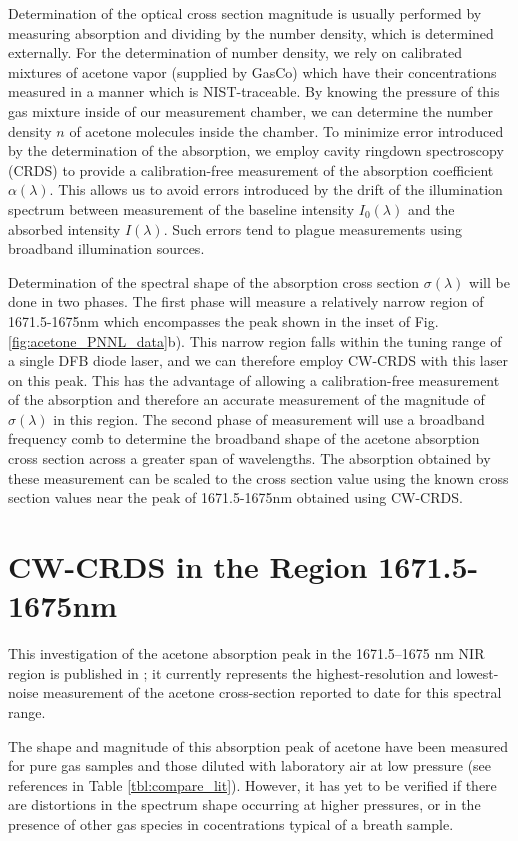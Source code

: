 \documentclass[12pt]{report}
\begin{document}
	Determination of the optical cross section magnitude is usually performed by measuring absorption and dividing by the number density, which is determined externally. For the determination of number density, we rely on calibrated mixtures of acetone vapor (supplied by GasCo) which have their concentrations measured in a manner which is NIST-traceable. By knowing the pressure of this gas mixture inside of our measurement chamber, we can determine the number density $n$ of acetone molecules inside the chamber. To minimize error introduced by the determination of the absorption, we employ cavity ringdown spectroscopy (CRDS) to provide a calibration-free measurement of the absorption coefficient $\alpha(\lambda)$. This allows us to avoid errors introduced by the drift of the illumination spectrum between measurement of the baseline intensity $I_0(\lambda)$ and the absorbed intensity $I(\lambda)$. Such errors tend to plague measurements using broadband illumination sources.
	
	Determination of the spectral shape of the absorption cross section $\sigma(\lambda)$ will be done in two phases. The first phase will measure a relatively narrow region of 1671.5-1675nm which encompasses the peak shown in the inset of Fig. \ref{fig:acetone_PNNL_data}b). This narrow region falls within the tuning range of a single DFB diode laser, and we can therefore employ CW-CRDS with this laser on this peak. This has the advantage of allowing a calibration-free measurement of the absorption and therefore an accurate measurement of the magnitude of $\sigma(\lambda)$ in this region. The second phase of measurement will use a broadband frequency comb to determine the broadband shape of the acetone absorption cross section across a greater span of wavelengths. The absorption obtained by these measurement can be scaled to the cross section value using the known cross section values near the peak of 1671.5-1675nm obtained using CW-CRDS.
	
	\section{CW-CRDS in the Region 1671.5-1675nm} \label{sec:acetone_peak}
	This investigation of the acetone absorption peak in the 1671.5–1675 nm NIR region is published in \cite{mine_acetone}; it currently represents the highest-resolution and lowest-noise measurement of the acetone cross-section reported to date for this spectral range.
	
	The shape and magnitude of this absorption peak of acetone have been measured for pure gas samples and those diluted with laboratory air at low pressure (see references in Table \ref{tbl:compare_lit}). However, it has yet to be verified if there are distortions in the spectrum shape occurring at higher pressures, or in the presence of other gas species in cocentrations typical of a breath sample.
	
\end{document}
